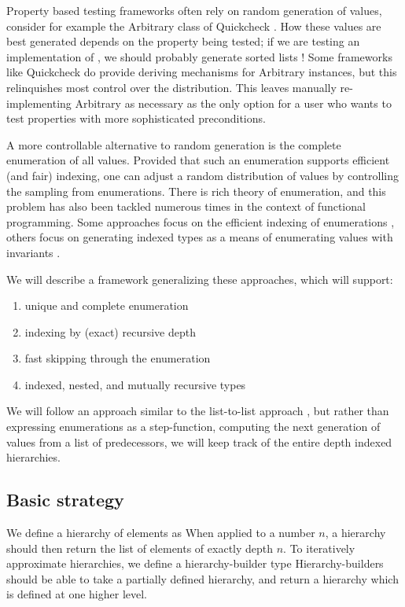 Property based testing frameworks often rely on random generation of values, consider for example the Arbitrary class of Quickcheck \cite{quickcheck}. How these values are best generated depends on the property being tested; if we are testing an implementation of , we should probably generate sorted lists \cite{rest}! Some frameworks like Quickcheck do provide deriving mechanisms for Arbitrary instances, but this relinquishes most control over the distribution. This leaves manually re-implementing Arbitrary as necessary as the only option for a user who wants to test properties with more sophisticated preconditions.

A more controllable alternative to random generation is the complete enumeration of all values. Provided that such an enumeration supports efficient (and fair) indexing, one can adjust a random distribution of values by controlling the sampling from enumerations. There is rich theory of enumeration, and this problem has also been tackled numerous times in the context of functional programming. Some approaches focus on the efficient indexing of enumerations \cite{feat}, others focus on generating indexed types as a means of enumerating values with invariants \cite{unique}.

We will describe a framework generalizing these approaches, which will support:
\begin{enumerate}
    \item unique and complete enumeration
    \item indexing by (exact) recursive depth
    \item fast skipping through the enumeration
    \item indexed, nested, and mutually recursive types
\end{enumerate}

We will follow an approach similar to the list-to-list approach \cite{unique}, but rather than expressing enumerations as a step-function, computing the next generation of values from a list of predecessors, we will keep track of the entire depth indexed hierarchies.

\subsection{Basic strategy}
We define a hierarchy of elements as
When applied to a number $n$, a hierarchy should then return the list of elements of exactly depth $n$. To iteratively approximate hierarchies, we define a hierarchy-builder type
Hierarchy-builders should be able to take a partially defined hierarchy, and return a hierarchy which is defined at one higher level.

